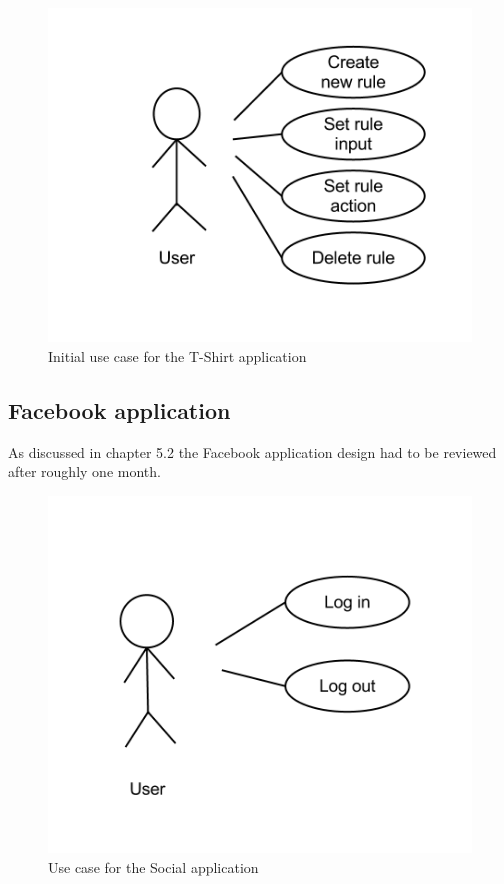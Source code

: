 \begin{figure}[h!]
\centering \includegraphics[scale=0.35]{img/design-tshirtappusecase1}
\caption{Initial use case for the T-Shirt application}
\label{fig:design-tshirtappusecase1}
\end{figure}

\subsection{Facebook application}

As discussed in chapter 5.2 the Facebook application design had to be reviewed after roughly one month.

\begin{figure}[h!]
\centering \includegraphics[scale=0.35]{img/design-socialappusecase2}
\caption{Use case for the Social application}
\label{fig:design-socialappusecase2}
\end{figure}

